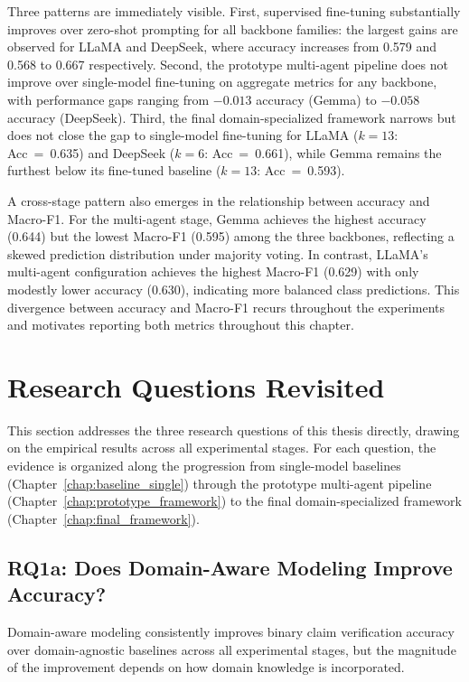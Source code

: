 Three patterns are immediately visible. First, supervised fine-tuning substantially improves over zero-shot prompting for all backbone families: the largest gains are observed for LLaMA and DeepSeek, where accuracy increases from 0.579 and 0.568 to 0.667 respectively. Second, the prototype multi-agent pipeline does not improve over single-model fine-tuning on aggregate metrics for any backbone, with performance gaps ranging from $-0.013$ accuracy (Gemma) to $-0.058$ accuracy (DeepSeek). Third, the final domain-specialized framework narrows but does not close the gap to single-model fine-tuning for LLaMA ($k{=}13$: Acc~=~0.635) and DeepSeek ($k{=}6$: Acc~=~0.661), while Gemma remains the furthest below its fine-tuned baseline ($k{=}13$: Acc~=~0.593).

A cross-stage pattern also emerges in the relationship between accuracy and Macro-F1. For the multi-agent stage, Gemma achieves the highest accuracy (0.644) but the lowest Macro-F1 (0.595) among the three backbones, reflecting a skewed prediction distribution under majority voting. In contrast, LLaMA's multi-agent configuration achieves the highest Macro-F1 (0.629) with only modestly lower accuracy (0.630), indicating more balanced class predictions. This divergence between accuracy and Macro-F1 recurs throughout the experiments and motivates reporting both metrics throughout this chapter.

\section{Research Questions Revisited}

This section addresses the three research questions of this thesis directly, drawing on the empirical results across all experimental stages. For each question, the evidence is organized along the progression from single-model baselines (Chapter~\ref{chap:baseline_single}) through the prototype multi-agent pipeline (Chapter~\ref{chap:prototype_framework}) to the final domain-specialized framework (Chapter~\ref{chap:final_framework}).

\subsection{RQ1a: Does Domain-Aware Modeling Improve Accuracy?}

Domain-aware modeling consistently improves binary claim verification accuracy over domain-agnostic baselines across all experimental stages, but the magnitude of the improvement depends on how domain knowledge is incorporated.


